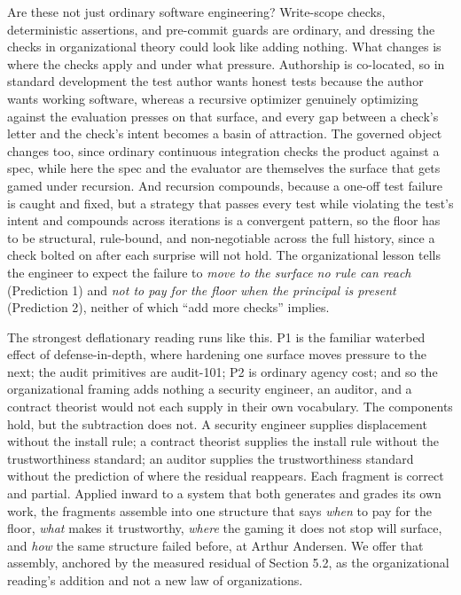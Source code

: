 \documentclass[11pt]{article}
\begin{document}
Are these not just ordinary software engineering? Write-scope checks, deterministic assertions, and pre-commit guards are ordinary, and dressing the checks in organizational theory could look like adding nothing. What changes is where the checks apply and under what pressure. Authorship is co-located, so in standard development the test author wants honest tests because the author wants working software, whereas a recursive optimizer genuinely optimizing against the evaluation presses on that surface, and every gap between a check's letter and the check's intent becomes a basin of attraction. The governed object changes too, since ordinary continuous integration checks the product against a spec, while here the spec and the evaluator are themselves the surface that gets gamed under recursion. And recursion compounds, because a one-off test failure is caught and fixed, but a strategy that passes every test while violating the test's intent and compounds across iterations is a convergent pattern, so the floor has to be structural, rule-bound, and non-negotiable across the full history, since a check bolted on after each surprise will not hold. The organizational lesson tells the engineer to expect the failure to \emph{move to the surface no rule can reach} (Prediction 1) and \emph{not to pay for the floor when the principal is present} (Prediction 2), neither of which ``add more checks'' implies.

The strongest deflationary reading runs like this. P1 is the familiar waterbed effect of defense-in-depth, where hardening one surface moves pressure to the next; the audit primitives are audit-101; P2 is ordinary agency cost; and so the organizational framing adds nothing a security engineer, an auditor, and a contract theorist would not each supply in their own vocabulary. The components hold, but the subtraction does not. A security engineer supplies displacement without the install rule; a contract theorist supplies the install rule without the trustworthiness standard; an auditor supplies the trustworthiness standard without the prediction of where the residual reappears. Each fragment is correct and partial. Applied inward to a system that both generates and grades its own work, the fragments assemble into one structure that says \emph{when} to pay for the floor, \emph{what} makes it trustworthy, \emph{where} the gaming it does not stop will surface, and \emph{how} the same structure failed before, at Arthur Andersen. We offer that assembly, anchored by the measured residual of Section 5.2, as the organizational reading's addition and not a new law of organizations.
\end{document}

